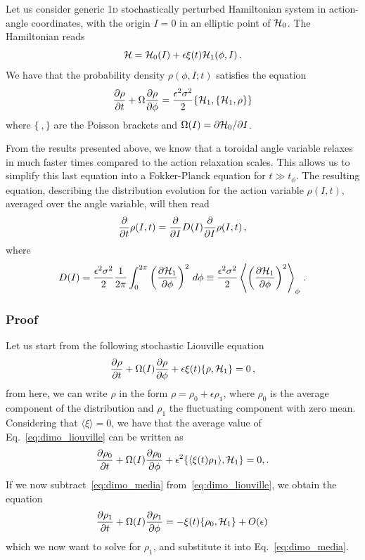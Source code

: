 Let us consider generic 1\textsc{d} stochastically perturbed Hamiltonian system in action-angle coordinates, with the origin $I=0$ in an elliptic point of \(\mathcal{H}_0\). The Hamiltonian reads
\begin{equation}
	\mathcal{H} = \mathcal{H}_0(I) + \epsilon \xi(t) \mathcal{H}_1(\phi, I) \,.
\end{equation}
We have that the probability density \(\rho(\phi, I; t)\) satisfies the equation
\begin{equation}
	\pdv{\rho}{t}\/ + \Omega \pdv{\rho}{\phi}\/ = \frac{\epsilon^2 \sigma^2}{2}\{\mathcal{H}_1, \{\mathcal{H}_1,\rho\}\}
	\label{eq:stoc_ham_complex_starting}
\end{equation}
where \(\{\ ,\}\) are the Poisson brackets and \(\Omega(I) = \partial \mathcal{H}_0/\partial I\).

From the results presented above, we know that a toroidal angle variable relaxes in much faster times compared to the action relaxation scales. This allows us to simplify this last equation into a Fokker-Planck equation for \(t\gg t_{\phi}\). The resulting equation, describing the distribution evolution for the action variable \(\rho(I,t)\), averaged over the angle variable, will then read
\begin{equation}
	\pdv{}{t}\/\rho(I,t) = \pdv{}{I}\/D(I)\pdv{}{I}\/\rho(I,t) \,,
\end{equation}
where
\begin{equation}
	D(I) = \frac{\epsilon^2 \sigma^2}{2}\frac{1}{2\pi}\int_0^{2\pi}\left(\pdv{\mathcal{H}_1}{\phi}\/\right)^2 \,d\phi \equiv \frac{\epsilon^2 \sigma^2}{2} \left\langle \left( \pdv{\mathcal{H}_1}{\phi}\/  \right)^2 \right\rangle_\phi \,.
\end{equation}

\subsubsection*{Proof}
Let us start from the following stochastic Liouville equation
\begin{equation}
	\pdv{\rho}{t}\/ + \Omega(I) \pdv{\rho}{\phi}\/ + \epsilon\xi(t)\{\rho,\mathcal{H}_1\} = 0\,,
	\label{eq:dimo_liouville}
\end{equation}
from here, we can write \(\rho\) in the form \(\rho = \rho_0 + \epsilon\rho_1\), where \(\rho_0\) is the average component of the distribution and \(\rho_1\) the fluctuating component with zero mean. Considering that \(\langle\xi\rangle = 0\), we have that the average value of Eq.~\eqref{eq:dimo_liouville} can be written as
\begin{equation}
	\pdv{\rho_0}{t}\/ + \Omega(I)\pdv{\rho_0}{\phi}\/ + \epsilon^2\{\langle\xi(t)\rho_1\rangle, \mathcal{H}_1\} = 0,.
	\label{eq:dimo_media}
\end{equation}
If we now subtract~\eqref{eq:dimo_media} from~\eqref{eq:dimo_liouville}, we obtain the equation
\begin{equation}
	\pdv{\rho_1}{t}\/ + \Omega(I) \pdv{\rho_1}{\phi}\/ = -\xi(t)\{\rho_0, \mathcal{H}_1\} + O(\epsilon)\,
\end{equation}
which we now want to solve for \(\rho_1\), and substitute it into Eq.~\eqref{eq:dimo_media}.

